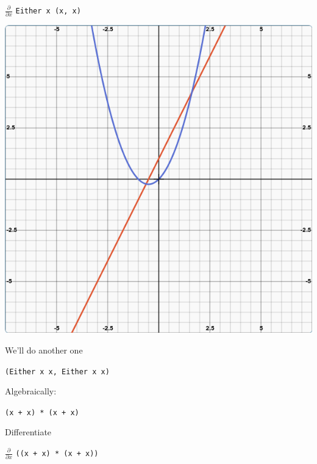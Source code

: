 \begin{frame}
\begin{block}{$\frac{\partial}{\partial x}$ \lstinline{Either x (x, x)}}
\begin{center}
\includegraphics[width=0.75\textheight]{image/derivative_x_plus_x_times_x.png}
\end{center}
\end{block}
\end{frame}


\begin{frame}
\begin{center}
We'll do another one

\lstinline{(Either x x, Either x x)}
\end{center}
\end{frame}


\begin{frame}
\begin{center}
Algebraically:

\lstinline{(x + x) * (x + x)}
\end{center}
\end{frame}


\begin{frame}
\begin{center}
Differentiate

$\frac{\partial}{\partial x}$ \lstinline{((x + x) * (x + x))}
\end{center}
\end{frame}



